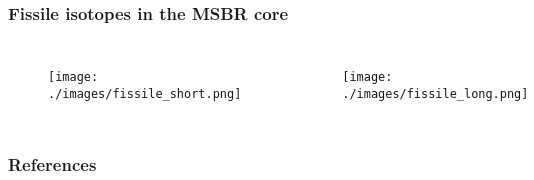 \documentclass[9pt,handout]{beamer}
\begin{document}
\begin{frame}
  \frametitle{Fissile isotopes in the \gls{MSBR} core}
  \begin{columns}
    \column[t]{6cm}
               \begin{figure}[t]
                \vspace*{-0.1in}
                \texttt{[image: ./images/fissile\_short.png]}
               \end{figure}
    \column[t]{6cm}
               \begin{figure}[t]
                \vspace*{-0.1in}
                \texttt{[image: ./images/fissile\_long.png]}
               \end{figure}
    \end{columns}
\end{frame}
\begin{frame}[allowframebreaks]
  \frametitle{References}
  
  {\footnotesize  }

\end{frame}
\end{document}
